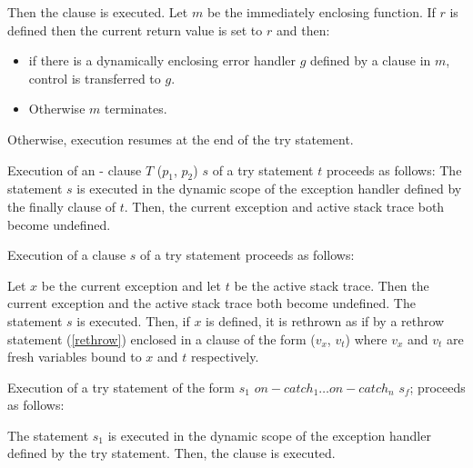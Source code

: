 \documentclass{article}
\newcommand{\code}[1]{{\sf #1}}
\begin{document}

\LMHash{}
Then the \FINALLY{} clause is executed. Let $m$ be the immediately enclosing function. If $r$ is defined then the current return value is set to $r$ and then:
\begin{itemize}
\item
 if there is a dynamically enclosing error handler $g$ defined by a \FINALLY{} clause in $m$, control is transferred to $g$.
 \item
Otherwise $m$ terminates.
\end{itemize}

Otherwise, execution resumes at the end of the try statement.

\LMHash{}
Execution of an \ON{}-\CATCH{} clause \code{\ON{} $T$ \CATCH{} ($p_1$, $p_2$)} $s$ of a try statement $t$ proceeds as follows: The statement $s$ is executed in the dynamic scope of the exception handler defined by the finally clause of $t$. Then, the current exception and active stack trace both become undefined.

\LMHash{}
Execution of a \FINALLY{} clause \FINALLY{} $s$ of a try statement proceeds as follows:

\LMHash{}
Let $x$ be the current exception and let $t$ be the active stack trace. Then the current exception and the active stack trace both become undefined. The statement $s$ is executed. Then, if $x$ is defined,  it is rethrown as if by a rethrow statement (\ref{rethrow}) enclosed in a \CATCH{} clause of the form \code{\CATCH{} ($v_x$, $v_t$)} where $v_x$ and $v_t$ are fresh variables bound to $x$ and $t$ respectively.


\LMHash{}
Execution of a try statement of the form \code{\TRY{} $s_1$ $on-catch_1 \ldots on-catch_n$ \FINALLY{} $s_f$;}  proceeds as follows:

\LMHash{}
The statement $s_1$ is executed in the dynamic scope of the exception handler defined by the try statement. Then, the \FINALLY{} clause is executed.

\end{document}
